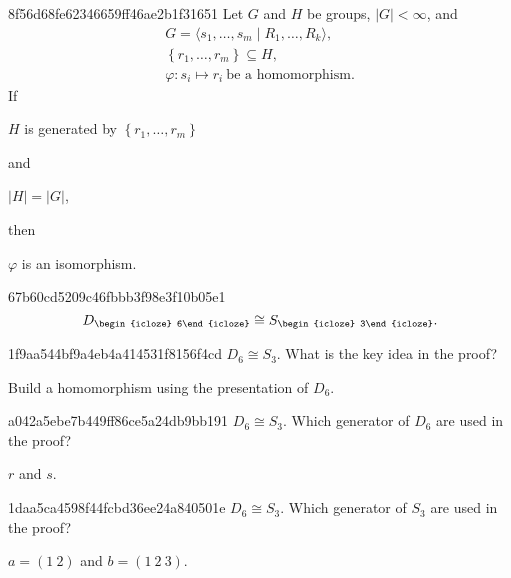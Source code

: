 \begin{note}{8f56d68fe62346659ff46ae2b1f31651}
    Let \({ G }\) and \({ H }\) be groups, \({ \left\lvert G \right\rvert < \infty }\), and
    \[
        \begin{gathered}
            G = \langle s_1, \ldots, s_m \mid R_1, \ldots, R_k \rangle, \\
            \left\{ r_1, \ldots, r_m \right\} \subseteq H, \\
            \varphi : s_i \mapsto r_i\ \text{be a homomorphism}.
        \end{gathered}
    \]
    If \begin{icloze}{3}\({ H }\) is generated by \({ \left\{ r_1, \ldots, r_m \right\} }\)\end{icloze} and \begin{icloze}{2}\({ \left\lvert H \right\rvert = \left\lvert G \right\rvert }\),\end{icloze} then \begin{icloze}{1}\({ \varphi }\) is an isomorphism.\end{icloze}
\end{note}

\begin{note}{67b60cd5209c46fbbb3f98e3f10b05e1}
    \[
        D_{\begin{icloze}{2}6\end{icloze}} \cong S_{\begin{icloze}{1}3\end{icloze}}.
    \]
\end{note}

\begin{note}{1f9aa544bf9a4eb4a414531f8156f4cd}
    \({ D_{6} \cong S_{3} }\). What is the key idea in the proof?

    \begin{cloze}{1}
        Build a homomorphism using the presentation of \({ D_6 }\).
    \end{cloze}
\end{note}

\begin{note}{a042a5ebe7b449ff86ce5a24db9bb191}
    \({ D_{6} \cong S_{3} }\). Which generator of \({ D_6 }\) are used in the proof?

    \begin{cloze}{1}
        \({ r }\) and \({ s }\).
    \end{cloze}
\end{note}

\begin{note}{1daa5ca4598f44fcbd36ee24a840501e}
    \({ D_{6} \cong S_{3} }\). Which generator of \({ S_3 }\) are used in the proof?

    \begin{cloze}{1}
        \({ a = (1\: 2) }\) and \({ b = (1\: 2\: 3) }\).
    \end{cloze}
\end{note}

